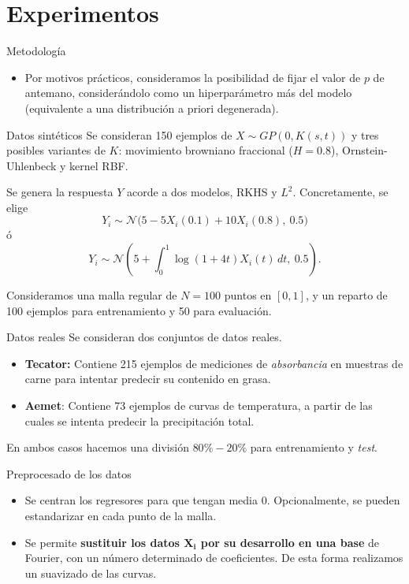 \documentclass[10pt, english, professionalfonts]{beamer}
\begin{document}
\section{Experimentos}

\begin{frame}{Metodología}
  \begin{itemize}
    \item Por motivos prácticos, consideramos la posibilidad de fijar el valor de \(p\) de antemano, considerándolo como un hiperparámetro más del modelo (equivalente a una distribución a priori degenerada).
  \end{itemize}
\end{frame}

\begin{frame}{Datos sintéticos}
  Se consideran 150 ejemplos de \(X \sim GP(0, K(s, t))\) y tres posibles variantes de \(K\): movimiento browniano fraccional (\(H=0.8\)), Ornstein-Uhlenbeck y kernel RBF.

  Se genera la respuesta \(Y\) acorde a dos modelos, RKHS y \(L^2\). Concretamente, se elige
  \[
    Y_i \sim \mathcal N\big(5 -5X_i(0.1) + 10X_i(0.8), \ 0.5\big)
  \]
  ó
  \[
    Y_i \sim \mathcal N\left(5 + \int_0^1 \log(1+4t)X_i(t)\, dt, \ 0.5\right).
  \]

Consideramos una malla regular de \(N=100\) puntos en \([0, 1]\), y un reparto de 100 ejemplos para entrenamiento y 50 para evaluación.
\end{frame}

\begin{frame}{Datos reales}
  Se consideran dos conjuntos de datos reales.
  \begin{itemize}
    \item \textbf{Tecator:} Contiene 215 ejemplos de mediciones de \textit{absorbancia} en muestras de carne para intentar predecir su contenido en grasa.
    \item \textbf{Aemet}: Contiene 73 ejemplos de curvas de temperatura, a partir de las cuales se intenta predecir la precipitación total.
  \end{itemize}

  En ambos casos hacemos una división \(80\%-20\%\) para entrenamiento y \textit{test}.
\end{frame}

\begin{frame}{Preprocesado de los datos}
  \begin{itemize}
    \item Se centran los regresores para que tengan media \(0\). Opcionalmente, se pueden estandarizar en cada punto de la malla.
    \item Se permite \textbf{sustituir los datos \(\boldsymbol{X_i}\) por su desarrollo en una base} de Fourier, con un número determinado de coeficientes. De esta forma realizamos un suavizado de las curvas.
  \end{itemize}
\end{frame}
\end{document}
